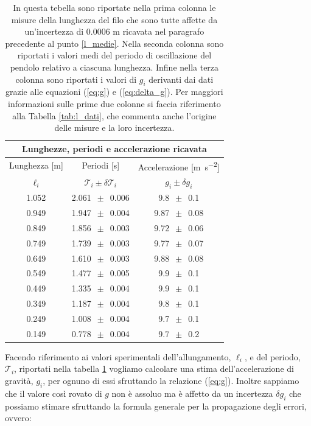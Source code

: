 \begin{table}
    \centering
    \begin{tabular}{c c c}
        \multicolumn{3}{c}{\textbf{Lunghezze, periodi e accelerazione ricavata}} \\
        \toprule
        Lunghezza [\si{\metre}] & Periodi [\si{\second}] & Accelerazione [\si{\metre\per\square\second}] \\ %
        $\ell_i$ & $\mathcal{T}_i \pm \delta\mathcal{T}_i$ & $g_i \pm \delta g_i$ \\
        \midrule
			1.052 & 2.061 $\,\pm\,$ 0.006 & 9.8 $\,\pm\,$ 0.1 \\
			0.949 & 1.947 $\,\pm\,$ 0.004 & 9.87 $\,\pm\,$ 0.08 \\
			0.849 & 1.856 $\,\pm\,$ 0.003 & 9.72 $\,\pm\,$ 0.06 \\
			0.749 & 1.739 $\,\pm\,$ 0.003 & 9.77 $\,\pm\,$ 0.07 \\
			0.649 & 1.610 $\,\pm\,$ 0.003 & 9.88 $\,\pm\,$ 0.08 \\
			0.549 & 1.477 $\,\pm\,$ 0.005 & 9.9 $\,\pm\,$ 0.1 \\
			0.449 & 1.335 $\,\pm\,$ 0.004 & 9.9 $\,\pm\,$ 0.1 \\
			0.349 & 1.187 $\,\pm\,$ 0.004 & 9.8 $\,\pm\,$ 0.1 \\
			0.249 & 1.008 $\,\pm\,$ 0.004 & 9.7 $\,\pm\,$ 0.1 \\
			0.149 & 0.778 $\,\pm\,$ 0.004 & 9.7 $\,\pm\,$ 0.2 \\
		\bottomrule
    \end{tabular}
    \caption{In questa tebella sono riportate nella prima colonna le misure della lunghezza del filo che sono tutte affette da un'incertezza di 0.0006 m ricavata nel paragrafo precedente al punto \ref{l_medie}. Nella seconda colonna sono riportati i valori medi del periodo di oscillazione del pendolo relativo a ciascuna lunghezza. Infine nella terza colonna sono riportati i valori di $g_i$ derivanti dai dati grazie alle equazioni (\ref{eq:g}) e (\ref{eq:delta_g}). Per maggiori informazioni sulle prime due colonne si faccia riferimento alla Tabella \ref{tab:l_dati}, che commenta anche l'origine delle misure e la loro incertezza.}
    \label{tab:calcolo_g}
\end{table}

Facendo riferimento ai valori sperimentali dell'allungamento, $\ell_i$, e del periodo, $\mathcal{T}_i$, riportati nella tabella \ref{tab:calcolo_g} vogliamo calcolare una stima dell'accelerazione di gravità, $g_i$, per ognuno di essi sfruttando la relazione (\ref{eq:g}). Inoltre sappiamo che il valore così rovato di $g$ non è assoluo ma è affetto da un incertezza $\delta g_i$ che possiamo stimare sfruttando la formula generale per la propagazione degli errori, ovvero:

